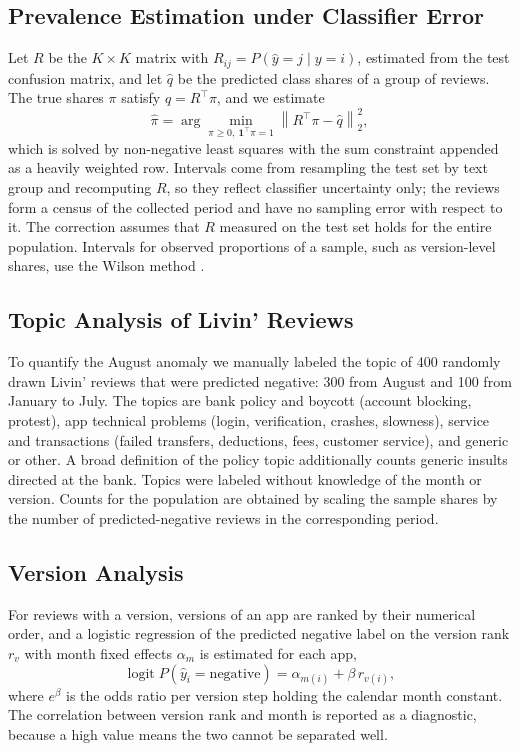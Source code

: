 \documentclass[conference]{IEEEtran}
\begin{document}
\subsection{Prevalence Estimation under Classifier Error}
Let $R$ be the $K\times K$ matrix with $R_{ij}=P(\hat{y}=j\mid y=i)$, estimated from the test confusion matrix, and let $\hat{q}$ be the predicted class shares of a group of reviews. The true shares $\pi$ satisfy $q=R^{\top}\pi$, and we estimate
\begin{equation}
\hat{\pi}=\arg\min_{\pi\ge 0,\ \mathbf{1}^{\top}\pi=1}\left\lVert R^{\top}\pi-\hat{q}\right\rVert_2^2,\label{eq:correction}
\end{equation}
which is solved by non-negative least squares \cite{b20} with the sum constraint appended as a heavily weighted row. Intervals come from resampling the test set by text group and recomputing $R$, so they reflect classifier uncertainty only; the reviews form a census of the collected period and have no sampling error with respect to it. The correction assumes that $R$ measured on the test set holds for the entire population. Intervals for observed proportions of a sample, such as version-level shares, use the Wilson method \cite{b21}.

\subsection{Topic Analysis of Livin' Reviews}
To quantify the August anomaly we manually labeled the topic of 400 randomly drawn Livin' reviews that were predicted negative: 300 from August and 100 from January to July. The topics are bank policy and boycott (account blocking, protest), app technical problems (login, verification, crashes, slowness), service and transactions (failed transfers, deductions, fees, customer service), and generic or other. A broad definition of the policy topic additionally counts generic insults directed at the bank. Topics were labeled without knowledge of the month or version. Counts for the population are obtained by scaling the sample shares by the number of predicted-negative reviews in the corresponding period.

\subsection{Version Analysis}
For reviews with a version, versions of an app are ranked by their numerical order, and a logistic regression of the predicted negative label on the version rank $r_v$ with month fixed effects $\alpha_m$ is estimated for each app,
\begin{equation}
\operatorname{logit}P(\hat{y}_i=\text{negative})=\alpha_{m(i)}+\beta\,r_{v(i)},\label{eq:logit}
\end{equation}
where $e^{\beta}$ is the odds ratio per version step holding the calendar month constant. The correlation between version rank and month is reported as a diagnostic, because a high value means the two cannot be separated well.
\end{document}
